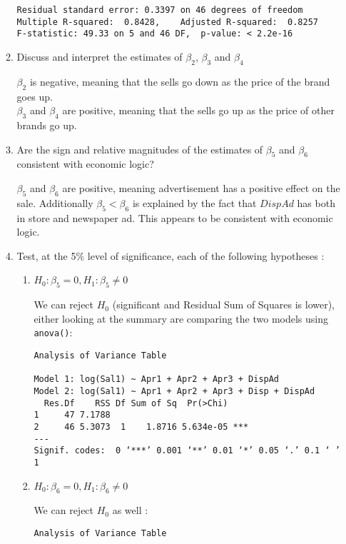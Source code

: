\documentclass[12pt]{article}
\begin{document}
\begin{enumerate}
\begin{enumerate}
\begin{Answer}
\begin{verbatim}
Residual standard error: 0.3397 on 46 degrees of freedom
Multiple R-squared:  0.8428,	Adjusted R-squared:  0.8257 
F-statistic: 49.33 on 5 and 46 DF,  p-value: < 2.2e-16
\end{verbatim}
\end{Answer}

\item Discuss and interpret the estimates of $\beta_2$, $\beta_3$ and $\beta_4$ \\
\begin{Answer}
$\beta_2$ is negative, meaning that the sells go down as the price of the brand goes up.\\
$\beta_3$ and $\beta_4$ are positive, meaning that the sells go up as the price of other brands go up.
\end{Answer}

\item Are the sign and relative magnitudes of the estimates of $\beta_5$ and $\beta_6$ consistent with economic logic?\\
\begin{Answer}
$\beta_5$ and $\beta_6$ are positive, meaning advertisement has a positive effect on the sale. Additionally $\beta_5 < \beta_6$ is explained by the fact that $DispAd$ has both in store and newspaper ad. This appears to be consistent with economic logic.
\end{Answer}

\item Test, at the 5\% level of significance, each of the following hypotheses :\\
\begin{enumerate}
\item $H_0:\beta_5 = 0, H_1:\beta_5\ne0$
\begin{Answer}
We can reject $H_0$ (significant and Residual Sum of Squares is lower), either looking at the summary are comparing the two models using \verb|anova()|:
\begin{verbatim}
Analysis of Variance Table

Model 1: log(Sal1) ~ Apr1 + Apr2 + Apr3 + DispAd
Model 2: log(Sal1) ~ Apr1 + Apr2 + Apr3 + Disp + DispAd
  Res.Df    RSS Df Sum of Sq  Pr(>Chi)    
1     47 7.1788                           
2     46 5.3073  1    1.8716 5.634e-05 ***
---
Signif. codes:  0 ‘***’ 0.001 ‘**’ 0.01 ‘*’ 0.05 ‘.’ 0.1 ‘ ’ 1
\end{verbatim}
\end{Answer}
\item $H_0:\beta_6 = 0, H_1:\beta_6\ne0$
\begin{Answer}
We can reject $H_0$ as well :
\begin{verbatim}
Analysis of Variance Table


\end{verbatim}
\end{Answer}
\end{enumerate}
\end{enumerate}
\end{enumerate}
\end{document}
